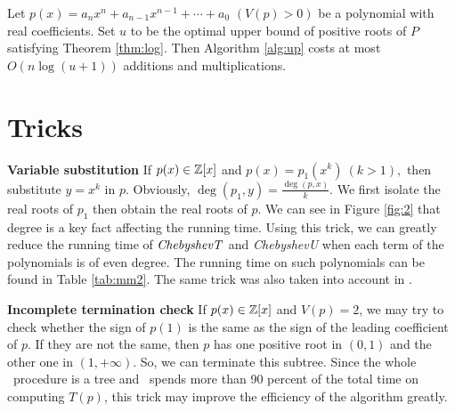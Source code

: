 \begin{corollary}
  Let $p(x)=a_nx^n+a_{n-1}x^{n-1}+\cdots+a_0$ $ (V(p)> 0)$ be a polynomial with real coefficients. Set $u$ to be the optimal upper bound of positive roots of $P$ satisfying Theorem
  \ref{thm:log}. Then  Algorithm \ref{alg:up} costs at most $O(n\log(u+1))$  additions and multiplications.
\end{corollary}


\section{Tricks}
{\bf Variable substitution}
If $p(x)\in {\mathbb Z}[x]$ and $p(x)=p_1(x^k)\ (k>1),$ then substitute $y=x^k$ in $p$. Obviously, $\deg(p_1,y)=\frac{\deg(p,x)}{k}$. We first isolate the real roots of $p_1$ then
obtain the real roots of $p$. We can see in Figure \ref{fig:2} that degree is a key fact affecting the running time. Using this trick, we can greatly reduce the running time of ${\it ChebyshevT}$
and {\it ChebyshevU} when each term of the polynomials is of even degree. The running time on such polynomials can be found in Table \ref{tab:mm2}. The same trick was also taken into account in \cite{johnson06}.

{\bf Incomplete termination check}
If $p(x)\in {\mathbb Z}[x]$ and $V(p)= 2$, we may try to check whether the sign of $p(1)$ is the same as the sign of the leading coefficient of $p$. If they are not the same, then $p$  has one positive root in $(0,1)$ and the other one in $(1,+\infty)$. So, we can terminate this subtree. Since the whole \froot\ procedure is a tree and \froot\ spends more than 90 percent of the
total time on computing $T(p)$, this trick may improve the efficiency of the algorithm greatly.